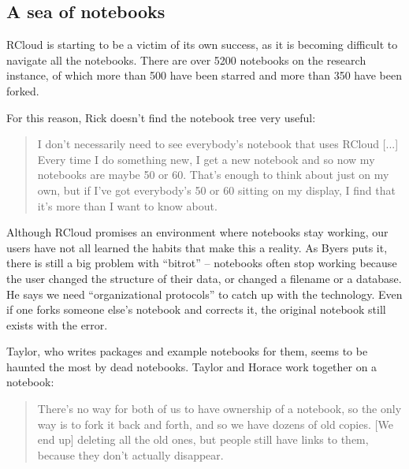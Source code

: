 

\subsection{A sea of notebooks}
RCloud is starting to be a victim of its own success, as it is becoming
difficult to navigate all the notebooks.  There are over 5200 notebooks on
the research instance, of which more than 500 have been starred and more
than 350 have been forked.

For this reason, Rick doesn't find the notebook tree very useful:
\begin{quote}
I don't necessarily need to see everybody's notebook that uses RCloud [...] Every
time I do something new, I get a new notebook and so now my notebooks are maybe
50 or 60. That's enough to think about just on my own, but if I've got
everybody's 50 or 60 sitting on my display, I find that it's more than I want to
know about.
\end{quote}

Although RCloud promises an environment where notebooks stay working, our
users have not all learned the habits that make this a reality. As Byers
puts it, there is still a big problem with ``bitrot'' -- notebooks often
stop working because the user changed the structure of their data, or
changed a filename or a database.  He says we need ``organizational
protocols'' to catch up with the technology. Even if one forks someone
else's notebook and corrects it, the original notebook still exists with
the error.


Taylor, who writes packages and example notebooks for them, seems to be
haunted the most by dead notebooks. Taylor and Horace work together on a notebook:
\begin{quote}
There's no way for both of us to have ownership of a notebook, so the only
way is to fork it back and forth, and so we have dozens of old copies. [We
end up] deleting all the old ones, but people still have links to them,
because they don't actually disappear.
\end{quote}

